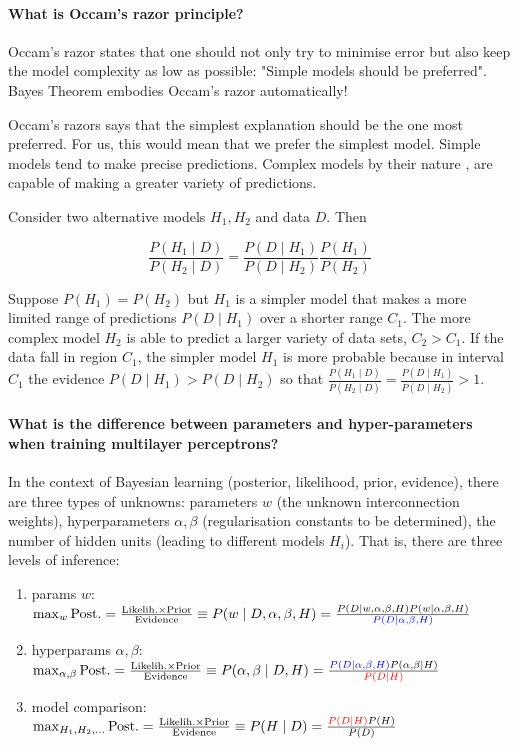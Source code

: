 \paragraph{What is Occam's razor principle?}

Occam's razor states that one should not only try to minimise error
but also keep the model complexity as low as possible:
"Simple models should be preferred". Bayes Theorem embodies Occam's razor automatically!

Occam's razors says that the simplest explanation should be the one most preferred. For us, this
would mean that we prefer the simplest model. Simple models tend to make precise predictions.
Complex models by their nature , are capable of making a greater variety of predictions.

Consider two alternative models $H_1, H_2$ and data $D$. Then

$$
\frac{P(H_1 \mid D)}{P(H_2 \mid D)} = \frac{P(D \mid H_1)}{P(D \mid H_2)} \frac{P(H_1)}{P(H_2)}
$$

Suppose $P(H_1) = P(H_2)$ but $H_1$ is a simpler model that makes a more limited range of predictions $P(D \mid H_1)$ over a shorter range $C_1$.
The more complex model $H_2$ is able to predict a larger variety of data sets, $C_2 > C_1$.
If the data fall in region $C_1$, the simpler model $H_1$ is more probable because
in interval $C_1$ the evidence $P(D \mid H_1) > P(D \mid H_2)$ so that
$\frac{P(H_1 \mid D)}{P(H_2 \mid D)} = \frac{P(D \mid H_1)}{P(D \mid H_2)} > 1$.

\paragraph{What is the difference between parameters and hyper-parameters when training multilayer perceptrons?}

In the context of Bayesian learning (posterior, likelihood, prior, evidence), there are three types of unknowns:
parameters $w$ (the unknown interconnection weights),
hyperparameters $\alpha, \beta$ (regularisation constants to be determined),
the number of hidden units (leading to different models $H_i$).
That is, there are three levels of inference:

\begin{enumerate}
    \item params $w$: $\max_w{\text{Post.} = \frac{\text{Likelih.} \times \text{Prior}}{\text{Evidence}}} \equiv P(w \mid D, \alpha, \beta, H) = \frac{P(D \mid w, \alpha, \beta, H) P(w \mid \alpha, \beta, H)}{\mathcolor{blue}{P(D \mid \alpha, \beta, H)}}$
    \item hyperparams $\alpha, \beta$:  $\max_{\alpha, \beta}{\text{Post.} = \frac{\text{Likelih.} \times \text{Prior}}{\text{Evidence}}} \equiv P(\alpha, \beta \mid D, H) = \frac{\mathcolor{blue}{P(D \mid \alpha, \beta, H)} P(\alpha, \beta \mid H)}{\mathcolor{red}{P(D \mid H)}}$
    \item model comparison:  $\max_{H_1, H_2, \dots}{\text{Post.} = \frac{\text{Likelih.} \times \text{Prior}}{\text{Evidence}}} \equiv P(H \mid D) = \frac{\mathcolor{red}{P(D \mid H)} P(H)}{P(D)}$
\end{enumerate}

